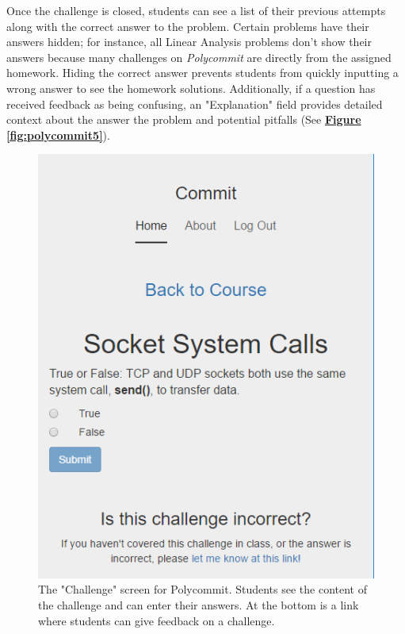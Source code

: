 \par Once the challenge is closed, students can see a list of their previous attempts along with the correct answer to the problem. Certain problems have their answers hidden; for instance, all Linear Analysis problems don't show their answers because many challenges on \textit{Polycommit} are directly from the assigned homework. Hiding the correct answer prevents students from quickly inputting a wrong answer to see the homework solutions. Additionally, if a question has received feedback as being confusing, an "Explanation" field provides detailed context about the answer the problem and potential pitfalls (See  \textbf{\hyperref[fig:polycommit5]{Figure \ref*{fig:polycommit5}}}).

\begin{figure}
	\includegraphics{figures/pc-question}
	\caption{The "Challenge" screen for Polycommit. Students see the content of the challenge and can enter their answers. At the bottom is a link where students can give feedback on a challenge.}
	\label{fig:polycommit3}
\end{figure}


